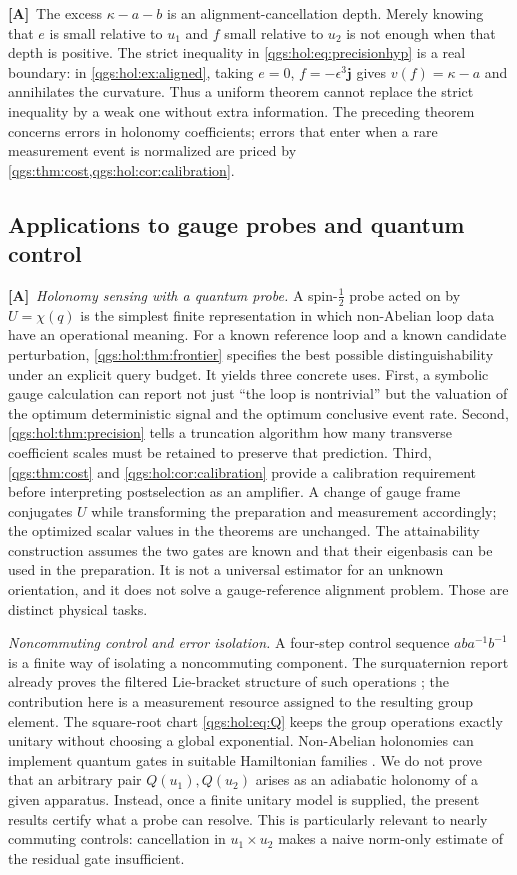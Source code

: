 \documentclass[11pt,oneside]{article}
\numberwithin{equation}{section}
\theoremstyle{plain}
\theoremstyle{definition}
\theoremstyle{remark}
\newcommand{\qj}{\mathbf j}
\newcommand{\TA}{\textcolor{TierA}{\textsf{\bfseries[A]}}}
\begin{document}
\TA\ The excess $\kappa-a-b$ is an alignment-cancellation depth. Merely knowing that $e$ is small relative to $u_1$ and $f$ small relative to $u_2$ is not enough when that depth is positive. The strict inequality in \eqref{qgs:hol:eq:precisionhyp} is a real boundary: in \cref{qgs:hol:ex:aligned}, taking $e=0$, $f=-\epsilon^3\qj$ gives $v(f)=\kappa-a$ and annihilates the curvature. Thus a uniform theorem cannot replace the strict inequality by a weak one without extra information. The preceding theorem concerns errors in holonomy coefficients; errors that enter when a rare measurement event is normalized are priced by \cref{qgs:thm:cost,qgs:hol:cor:calibration}.

\subsection{Applications to gauge probes and quantum control}\label{qgs:hol:sec:physics}
\TA\ \emph{Holonomy sensing with a quantum probe.} A spin-$\tfrac12$ probe acted on by $U=\chi(q)$ is the simplest finite representation in which non-Abelian loop data have an operational meaning. For a known reference loop and a known candidate perturbation, \cref{qgs:hol:thm:frontier} specifies the best possible distinguishability under an explicit query budget. It yields three concrete uses. First, a symbolic gauge calculation can report not just ``the loop is nontrivial'' but the valuation of the optimum deterministic signal and the optimum conclusive event rate. Second, \cref{qgs:hol:thm:precision} tells a truncation algorithm how many transverse coefficient scales must be retained to preserve that prediction. Third, \cref{qgs:thm:cost} and \cref{qgs:hol:cor:calibration} provide a calibration requirement before interpreting postselection as an amplifier. A change of gauge frame conjugates $U$ while transforming the preparation and measurement accordingly; the optimized scalar values in the theorems are unchanged. The attainability construction assumes the two gates are known and that their eigenbasis can be used in the preparation. It is not a universal estimator for an unknown orientation, and it does not solve a gauge-reference alignment problem. Those are distinct physical tasks.

\emph{Noncommuting control and error isolation.} A four-step control sequence $aba^{-1}b^{-1}$ is a finite way of isolating a noncommuting component. The surquaternion report already proves the filtered Lie-bracket structure of such operations \cite{repoQuaternion}; the contribution here is a measurement resource assigned to the resulting group element. The square-root chart \eqref{qgs:hol:eq:Q} keeps the group operations exactly unitary without choosing a global exponential. Non-Abelian holonomies can implement quantum gates in suitable Hamiltonian families \cite{ZanardiRasetti}. We do not prove that an arbitrary pair $Q(u_1),Q(u_2)$ arises as an adiabatic holonomy of a given apparatus. Instead, once a finite unitary model is supplied, the present results certify what a probe can resolve. This is particularly relevant to nearly commuting controls: cancellation in $u_1\times u_2$ makes a naive norm-only estimate of the residual gate insufficient.
\end{document}
